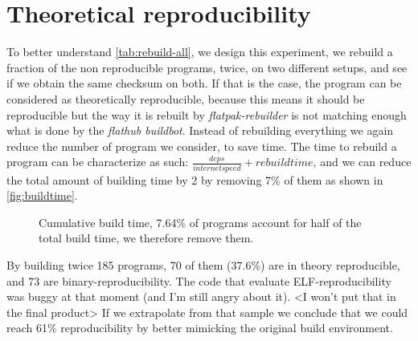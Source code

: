 \documentclass[a4paper,11pt,oneside]{report}
\theoremstyle{definition}
\newcommand{\sysname}{\emph{flatpak-rebuilder}\xspace}
\newcommand{\fhbb}{\emph{flathub buildbot}\xspace}
\begin{document}
\section{Theoretical reproducibility}
\label{sec:theo-repro}
To better understand \autoref{tab:rebuild-all}, we design this experiment, we
rebuild a fraction of the non reproducible programs, twice, on two different
setups, and see if we obtain the same checksum on both. If that is the case,
the program can be considered as theoretically reproducible, because this means
it should be reproducible but the way it is rebuilt by \sysname is not matching
enough what is done by the \fhbb. Instead of rebuilding everything we again
reduce the number of program we consider, to save time. The time to rebuild a
program can be characterize as such: $\frac{deps}{internet speed} + rebuild
time$, and we can reduce the total amount of building time by 2 by removing 7\%
of them as shown in \autoref{fig:buildtime}.

\begin{figure}[h]
    \caption{Cumulative build time, 7.64\% of programs
    account for half of the total build time, we therefore remove them.}
    \label{fig:buildtime}
\end{figure}

By building twice 185 programs, 70 of them (37.6\%) are in theory reproducible,
and 73 are binary-reproducibility. The code that evaluate ELF-reproducibility
was buggy at that moment (and I'm still angry about it). <I won't put that in
the final product>
If we extrapolate from that sample we conclude that we could reach 61\%
reproducibility by better mimicking the original build environment.
\end{document}

